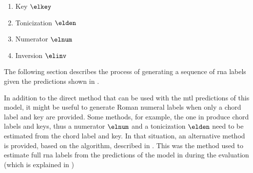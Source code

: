 \begin{enumerate}
    \item Key $\elkey$
    \item Tonicization $\elden$
    \item Numerator $\elnum$
    \item Inversion $\elinv$
\end{enumerate}

The following section describes the process of generating a
sequence of \gls{rna} labels given the predictions shown in
. 

In addition to the direct method that can be used with the
\gls{mtl} predictions of this model, it might be useful to
generate Roman numeral labels when only a chord label and
key are provided. Some methods, for example, the one in
\textcite{mcleod2021modular} produce chord labels and keys,
thus a numerator $\elnum$ and a tonicization $\elden$ need
to be estimated from the chord label and key. In that
situation, an alternative method is provided, based on the
\algorithmrn{} algorithm, described in
.
This was the method used to estimate full \gls{rna} labels
from the predictions of the model in
\textcite{mcleod2021modular, chen2021attend} during the
evaluation (which is explained in
)












